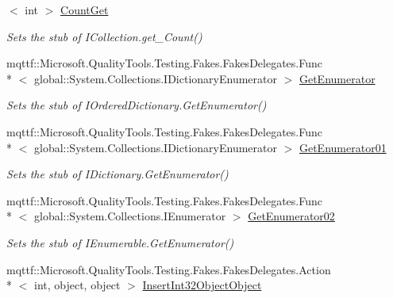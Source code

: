 \begin{DoxyCompactItemize}
$<$ int $>$ \hyperlink{class_system_1_1_collections_1_1_specialized_1_1_fakes_1_1_stub_i_ordered_dictionary_a24f508a9f654b21f5ff7d0acfecda90e}{Count\-Get}
\begin{DoxyCompactList}\small\item\em Sets the stub of I\-Collection.\-get\-\_\-\-Count()\end{DoxyCompactList}\item 
mqttf\-::\-Microsoft.\-Quality\-Tools.\-Testing.\-Fakes.\-Fakes\-Delegates.\-Func\\*
$<$ global\-::\-System.\-Collections.\-I\-Dictionary\-Enumerator $>$ \hyperlink{class_system_1_1_collections_1_1_specialized_1_1_fakes_1_1_stub_i_ordered_dictionary_a98f13b6a25737190e7f3b2a082ae2cc8}{Get\-Enumerator}
\begin{DoxyCompactList}\small\item\em Sets the stub of I\-Ordered\-Dictionary.\-Get\-Enumerator()\end{DoxyCompactList}\item 
mqttf\-::\-Microsoft.\-Quality\-Tools.\-Testing.\-Fakes.\-Fakes\-Delegates.\-Func\\*
$<$ global\-::\-System.\-Collections.\-I\-Dictionary\-Enumerator $>$ \hyperlink{class_system_1_1_collections_1_1_specialized_1_1_fakes_1_1_stub_i_ordered_dictionary_abbec93c75773cb77faf2ec9360e3df99}{Get\-Enumerator01}
\begin{DoxyCompactList}\small\item\em Sets the stub of I\-Dictionary.\-Get\-Enumerator()\end{DoxyCompactList}\item 
mqttf\-::\-Microsoft.\-Quality\-Tools.\-Testing.\-Fakes.\-Fakes\-Delegates.\-Func\\*
$<$ global\-::\-System.\-Collections.\-I\-Enumerator $>$ \hyperlink{class_system_1_1_collections_1_1_specialized_1_1_fakes_1_1_stub_i_ordered_dictionary_a23983686818798e69058c063cc3c5a9e}{Get\-Enumerator02}
\begin{DoxyCompactList}\small\item\em Sets the stub of I\-Enumerable.\-Get\-Enumerator()\end{DoxyCompactList}\item 
mqttf\-::\-Microsoft.\-Quality\-Tools.\-Testing.\-Fakes.\-Fakes\-Delegates.\-Action\\*
$<$ int, object, object $>$ \hyperlink{class_system_1_1_collections_1_1_specialized_1_1_fakes_1_1_stub_i_ordered_dictionary_ab147c12157a48c212eaccbfa8373a982}{Insert\-Int32\-Object\-Object}

\end{DoxyCompactItemize}
